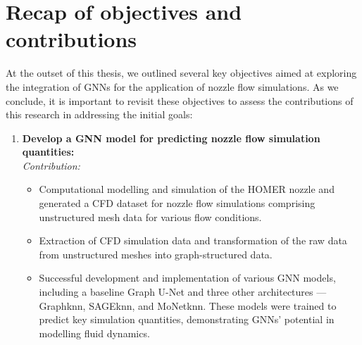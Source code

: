\section{Recap of objectives and contributions}
At the outset of this thesis, we outlined several key objectives aimed at exploring the integration of GNNs for the application of nozzle flow simulations. As we conclude, it is important to revisit these objectives to assess the contributions of this research in addressing the initial goals:
\begin{enumerate}
    \item \textbf{Develop a GNN model for predicting nozzle flow simulation quantities:} \\
    \textit{Contribution:}
    \begin{itemize}
        \item Computational modelling and simulation of the HOMER nozzle and generated a CFD dataset for nozzle flow simulations comprising unstructured mesh data for various flow conditions. 
        \item Extraction of CFD simulation data and transformation of the raw data from unstructured meshes into graph-structured data.
        \item Successful development and implementation of various GNN models, including a baseline Graph U-Net and three other architectures — Graphknn, SAGEknn, and MoNetknn. These models were trained to predict key simulation quantities, demonstrating GNNs' potential in modelling fluid dynamics.
    \end{itemize}
    

\end{enumerate}
